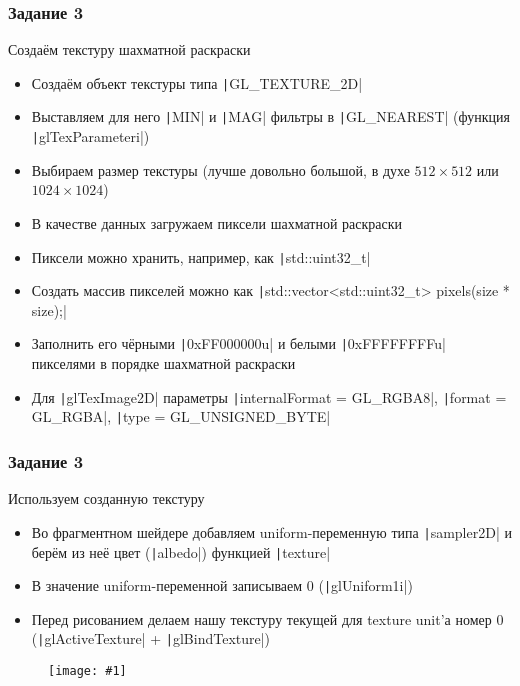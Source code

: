 \documentclass[10pt]{beamer}
\newcommand{\slideimage}[1]{
  \begin{figure}
    \begin{adjustbox}{width=\textwidth, totalheight=\textheight-2\baselineskip-2\baselineskip,keepaspectratio}
      \texttt{[image: \#1]}
    \end{adjustbox}
  \end{figure}
}
\begin{document}
\begin{frame}[fragile]
\frametitle{Задание 3}
Создаём текстуру шахматной раскраски
\begin{itemize}
\item Создаём объект текстуры типа \texttt|GL_TEXTURE_2D|
\item Выставляем для него \texttt|MIN| и \texttt|MAG| фильтры в \texttt|GL_NEAREST| (функция \texttt|glTexParameteri|)
\item Выбираем размер текстуры (лучше довольно большой, в духе \begin{math}512\times 512\end{math} или \begin{math}1024\times 1024\end{math})
\item В качестве данных загружаем пиксели шахматной раскраски
\item Пиксели можно хранить, например, как \texttt|std::uint32_t|
\item Создать массив пикселей можно как \texttt|std::vector<std::uint32_t> pixels(size * size);|
\item Заполнить его чёрными \texttt|0xFF000000u| и белыми \texttt|0xFFFFFFFFu| пикселями в порядке шахматной раскраски
\item Для \texttt|glTexImage2D| параметры \texttt|internalFormat = GL_RGBA8|, \texttt|format = GL_RGBA|, \texttt|type = GL_UNSIGNED_BYTE|
\end{itemize}
\end{frame}

\begin{frame}[fragile]
\frametitle{Задание 3}
Используем созданную текстуру
\begin{itemize}
\item Во фрагментном шейдере добавляем uniform-переменную типа \texttt|sampler2D| и берём из неё цвет (\texttt|albedo|) функцией \texttt|texture|
\item В значение uniform-переменной записываем 0 (\texttt|glUniform1i|)
\item Перед рисованием делаем нашу текстуру текущей для texture unit'а номер 0 (\texttt|glActiveTexture| + \texttt|glBindTexture|)
\end{itemize}
\end{frame}

\begin{frame}[fragile]
\slideimage{3.png}
\end{frame}
\end{document}
